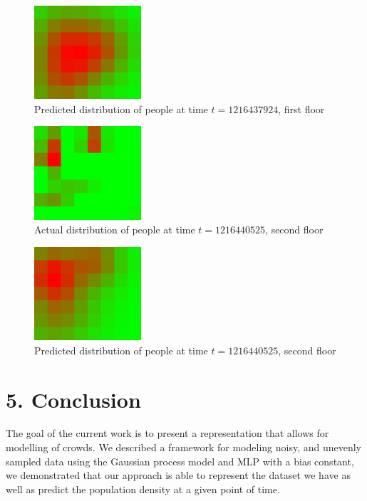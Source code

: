 \documentclass[letterpaper]{article}
\begin{document}
\begin{figure}[h!]
  \centering
    \includegraphics[width=150px,natwidth=320,natheight=280]{selected_renders/0_1216437924p.png}
  \caption{Predicted distribution of people at time $t=1216437924$, first floor}
  \label{fig:t2dist}
\end{figure}

\begin{figure}[h!]
  \centering
    \includegraphics[width=150px,natwidth=320,natheight=280]{selected_renders/1_1216440525.png}
  \caption{Actual distribution of people at time $t=1216440525$, second floor}
  \label{fig:t3dist}
\end{figure}

\begin{figure}[h!]
  \centering
    \includegraphics[width=150px,natwidth=320,natheight=280]{selected_renders/1_1216440525p.png}
  \caption{Predicted distribution of people at time $t=1216440525$, second floor}
  \label{fig:t4dist}
\end{figure}


\section{5.  Conclusion}

The goal of the current work is to present a representation that allows for modelling of crowds. We described a framework for modeling noisy, and unevenly sampled
data using the Gaussian process model and MLP with a bias constant, we demonstrated that our approach is able to represent the dataset we have as well as predict the population density at a given point of time.
\end{document}
